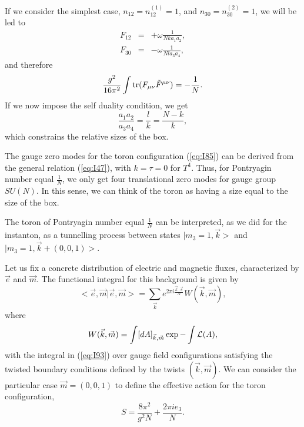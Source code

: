 If we consider the simplest case, $n_{12}=n_{12}^{(1)}=1$, and
$n_{30}=n_{30}^{(2)}=1$, we will be led to
\begin{eqnarray}
F_{12} & = & + \omega \frac {1}{Nk a_1 a_2}, \nonumber \\
F_{30} & = & - \omega \frac {1}{Nl a_3 a_4}, 
\label{eq:I89}
\end{eqnarray}
and therefore
\begin{equation}
\frac {g^2}{16 \pi^2} \int \hbox {tr} (F_{\mu \nu} \tilde{F}^{\mu
\nu}) = - \frac {1}{N}.
\label{eq:I90}
\end{equation}
If we now impose the self duality condition, we get
\begin{equation}
\frac {a_1 a_2}{a_3 a_4} = \frac {l}{k} = \frac {N-k}{k},
\label{eq:I91}
\end{equation}
which constrains the relative sizes of the box. 
  
The gauge zero modes for the toron configuration (\ref{eq:I85})
can be derived from the general relation (\ref{eq:I47}), with
$k=\tau=0$ for $T^4$. Thus, for Pontryagin number equal $\frac
{1}{N}$, we only get four translational zero modes for gauge
group $SU(N)$. In this sense, we can think of the toron as having
a size equal to the size of the box.
  
The toron of Pontryagin number equal $\frac {1}{N}$ can be
interpreted, as we did for the instanton, as a tunnelling process
between states $|m_3=1,\vec{k}>$ and  $|m_3=1,\vec{k}+(0,0,1)>$.
  

Let us fix a concrete distribution of electric and magnetic
fluxes, characterized by $\vec{e}$ and $\vec{m}$. The functional
integral for this background is given by \cite{tHcmp}
\begin{equation}
<\vec{e},\vec{m} | \vec{e},\vec{m}> = \sum_{\vec{k}} e^{2 \pi i
\frac {\vec{k} \cdot \vec{e}}{N}} W(\vec{k},\vec{m}),
\label{eq:I92}
\end{equation}
where
\begin{equation}
W(\vec{k},\vec{m}) = \int [dA]_{\vec{k},\vec{m}} \exp - \int 
{\cal L}(A),
\label{eq:I93}
\end{equation}
with the integral in (\ref{eq:I93}) over gauge field
configurations satisfying the twisted boundary conditions
defined by the twists $(\vec{k},\vec{m})$. We can consider the
particular case $\vec{m}=(0,0,1)$ to define the effective action
for the toron configuration,
\begin{equation}
S = \frac {8 \pi^2}{g^2 N} + \frac {2 \pi i e_3}{N}.
\label{eq:I94}
\end{equation}
  
